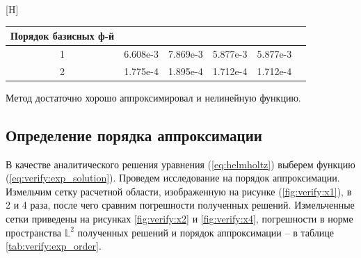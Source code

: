 \documentclass[a4paper,14pt]{article}
\makeatletter
\renewenvironment{table}[1][\fps@table]{
  \edef\@tempa{\noexpand\@float{table}[#1]}
  \@tempa
  \addtocounter{footable}{1}
}{
  \end@float
}
\makeatother
\begin{document}
\begin{table}[H]
	\caption{относительные погрешности в норме $\mathbb{L}^2$}
	\label{tab:verify:exp_diff}
	\begin{tabularx}{\textwidth}{|C{1}|C{1}|C{1}|C{1}|C{1}|C{1}|}
		\hline Порядок базисных ф-й &  &  &  &  \\
		 & 6.608e-3 & 7.869e-3 & 5.877e-3 & 5.877e-3 \\
		 & 1.775e-4 & 1.895e-4 & 1.712e-4 & 1.712e-4 \\
		\hline
	\end{tabularx}
\end{table}
\vspace{-0.5cm}Метод достаточно хорошо аппроксимировал и нелинейную функцию.


\subsection{Определение порядка аппроксимации}

В качестве аналитического решения уравнения (\ref{eq:helmholtz}) выберем функцию (\ref{eq:verify:exp_solution}). Проведем исследование на порядок аппроксимации. Измельчим сетку расчетной области, изображенную на рисунке (\ref{fig:verify:x1}), в 2 и 4 раза, после чего сравним погрешности полученных решений. Измельченные сетки приведены на рисунках \ref{fig:verify:x2} и \ref{fig:verify:x4}, погрешности в норме пространства $\mathbb{L}^2$ полученных решений и порядок аппроксимации -- в таблице \ref{tab:verify:exp_order}.
\end{document}
